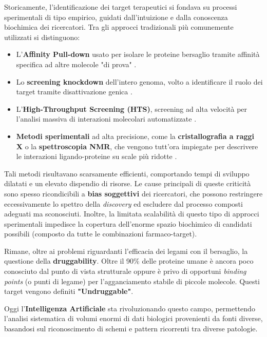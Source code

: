 Storicamente, l'identificazione dei target terapeutici si fondava su processi sperimentali di tipo empirico, guidati dall'intuizione e dalla conoscenza biochimica dei ricercatori.
Tra gli approcci tradizionali più comunemente utilizzati si distinguono:
\begin{itemize}
    \item L'\textbf{Affinity Pull-down} usato per isolare le proteine bersaglio tramite affinità specifica ad altre molecole "di prova" \cite{zhangArtificialIntelligenceDrug2025}.
    \item Lo \textbf{screening knockdown} dell'intero genoma, volto a identificare il ruolo dei target tramite disattivazione genica \cite{zhangArtificialIntelligenceDrug2025}.
    \item L'\textbf{High-Throughput Screening (HTS)}, screening ad alta velocità per l'analisi massiva di interazioni molecolari automatizzate \cite{mondalAIdrivenDrugTarget2026a}.
    \item \textbf{Metodi sperimentali} ad alta precisione, come la \textbf{cristallografia a raggi X} o la \textbf{spettroscopia NMR}, che vengono tutt'ora impiegate per descrivere le interazioni ligando-proteine su scale più ridotte \cite{kumarPredictingDrugtargetInteractions2026a}.
\end{itemize}
Tali metodi risultavano scarsamente efficienti, comportando tempi di sviluppo dilatati e un elevato dispendio di risorse.
Le cause principali di queste criticità sono spesso ricondicibili a \textbf{bias soggettivi} dei ricercatori, che possono restringere eccessivamente lo spettro della \textit{discovery} ed escludere dal processo composti adeguati ma sconosciuti.
Inoltre, la limitata scalabilità di questo tipo di approcci sperimentali impedisce la copertura dell'enorme spazio biochimico di candidati possibili (composto da tutte le combinazioni farmaco-target).

Rimane, oltre ai problemi riguardanti l'efficacia dei legami con il bersaglio, la questione della \textbf{druggability}. Oltre il 90\% delle proteine umane è ancora poco conosciuto dal punto di vista strutturale \cite{freedmanHuntingNewDrugs} oppure è privo di opportuni \textit{binding points} (o punti di legame) per l'agganciamento stabile di piccole molecole. Questi target vengono definiti \textbf{"Undruggable"}.

Oggi l'\textbf{Intelligenza Artificiale} sta rivoluzionando questo campo, permettendo l'analisi sistematica di volumi enormi di dati biologici provenienti da fonti diverse, basandosi sul riconoscimento di schemi e pattern ricorrenti tra diverse patologie.

